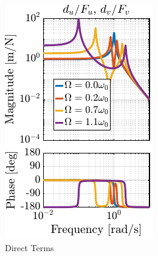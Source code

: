 \documentclass[10pt]{iopart}
\begin{document}
\begin{figure}[htbp]
\begin{subfigure}[c]{0.48\linewidth}
\includegraphics[width=\linewidth]{figs/fig03a.pdf}
\caption{\label{fig:plant_compare_rotating_speed_direct} Direct Terms}
\end{subfigure}
\hfill
\begin{subfigure}[c]{0.48\linewidth}

\end{subfigure}
\end{figure}
\end{document}
